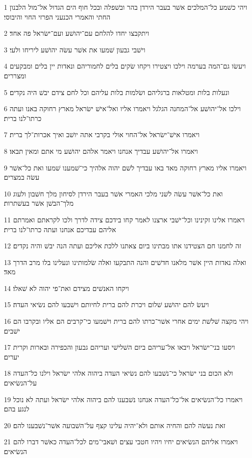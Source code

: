 \par 1 ויהי כשׁמע כל־המלכים אשׁר בעבר הירדן בהר ובשׁפלה ובכל חוף הים הגדול אל־מול הלבנון החתי והאמרי הכנעני הפרזי החוי והיבוסי׃
\par 2 ויתקבצו יחדו להלחם עם־יהושׁע ועם־ישׂראל פה אחד׃
\par 3 וישׁבי גבעון שׁמעו את אשׁר עשׂה יהושׁע ליריחו ולעי׃
\par 4 ויעשׂו גם־המה בערמה וילכו ויצטירו ויקחו שׂקים בלים לחמוריהם ונאדות יין בלים ומבקעים ומצררים׃
\par 5 ונעלות בלות ומטלאות ברגליהם ושׂלמות בלות עליהם וכל לחם צידם יבשׁ היה נקדים׃
\par 6 וילכו אל־יהושׁע אל־המחנה הגלגל ויאמרו אליו ואל־אישׁ ישׂראל מארץ רחוקה באנו ועתה כרתו־לנו ברית׃
\par 7 ויאמרו אישׁ־ישׂראל אל־החוי אולי בקרבי אתה יושׁב ואיך אכרות־לך ברית׃
\par 8 ויאמרו אל־יהושׁע עבדיך אנחנו ויאמר אלהם יהושׁע מי אתם ומאין תבאו׃
\par 9 ויאמרו אליו מארץ רחוקה מאד באו עבדיך לשׁם יהוה אלהיך כי־שׁמענו שׁמעו ואת כל־אשׁר עשׂה במצרים׃
\par 10 ואת כל־אשׁר עשׂה לשׁני מלכי האמרי אשׁר בעבר הירדן לסיחון מלך חשׁבון ולעוג מלך־הבשׁן אשׁר בעשׁתרות׃
\par 11 ויאמרו אלינו זקינינו וכל־ישׁבי ארצנו לאמר קחו בידכם צידה לדרך ולכו לקראתם ואמרתם אליהם עבדיכם אנחנו ועתה כרתו־לנו ברית׃
\par 12 זה לחמנו חם הצטידנו אתו מבתינו ביום צאתנו ללכת אליכם ועתה הנה יבשׁ והיה נקדים׃
\par 13 ואלה נאדות היין אשׁר מלאנו חדשׁים והנה התבקעו ואלה שׂלמותינו ונעלינו בלו מרב הדרך מאד׃
\par 14 ויקחו האנשׁים מצידם ואת־פי יהוה לא שׁאלו׃
\par 15 ויעשׂ להם יהושׁע שׁלום ויכרת להם ברית לחיותם וישׁבעו להם נשׂיאי העדה׃
\par 16 ויהי מקצה שׁלשׁת ימים אחרי אשׁר־כרתו להם ברית וישׁמעו כי־קרבים הם אליו ובקרבו הם ישׁבים׃
\par 17 ויסעו בני־ישׂראל ויבאו אל־עריהם ביום השׁלישׁי ועריהם גבעון והכפירה ובארות וקרית יערים׃
\par 18 ולא הכום בני ישׂראל כי־נשׁבעו להם נשׂיאי העדה ביהוה אלהי ישׂראל וילנו כל־העדה על־הנשׂיאים׃
\par 19 ויאמרו כל־הנשׂיאים אל־כל־העדה אנחנו נשׁבענו להם ביהוה אלהי ישׂראל ועתה לא נוכל לנגע בהם׃
\par 20 זאת נעשׂה להם והחיה אותם ולא־יהיה עלינו קצף על־השׁבועה אשׁר־נשׁבענו להם׃
\par 21 ויאמרו אליהם הנשׂיאים יחיו ויהיו חטבי עצים ושׁאבי־מים לכל־העדה כאשׁר דברו להם הנשׂיאים׃
